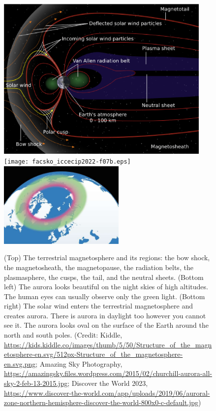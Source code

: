 \documentclass[sn-aps]{sn-jnl}%
\begin{document}
\begin{figure}[t]
\centering
\includegraphics[width=0.935\textwidth]{facsko_iccecip2022-f07a.eps}
\texttt{[image: facsko\_iccecip2022-f07b.eps]}
\includegraphics[width=0.55\textwidth]{facsko_iccecip2022-f07c.eps}
\caption{(Top) The terrestrial magnetosphere and its regions: the bow shock, the magnetosheath, the magnetopause, the radiation belts, the plasmasphere, the cusps, the tail, and the neutral sheets. (Bottom left) The aurora looks beautiful on the night skies of high altitudes. The human eyes can usually observe only the green light. (Bottom right) The solar wind enters the terrestrial magnetosphere and creates aurora. There is aurora in daylight too however you cannot see it. The aurora looks oval on the surface of the Earth around the north and south poles. (Credit: Kiddle, \url{https://kids.kiddle.co/images/thumb/5/50/Structure_of_the_magnetosphere-en.svg/512px-Structure_of_the_magnetosphere-en.svg.png}; Amazing Sky Photography, \url{https://amazingsky.files.wordpress.com/2015/02/churchill-aurora-all-sky-2-feb-13-2015.jpg}; Discover the World 2023, \url{https://www.discover-the-world.com/app/uploads/2019/06/auroral-zone-northern-hemisphere-discover-the-world-800x0-c-default.jpg})} \label{fig:aurora}
\end{figure}
\end{document}
